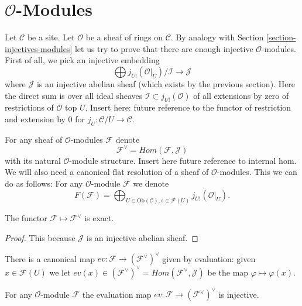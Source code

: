 \section{$\mathcal{O}$-Modules}
\label{section-sheaves-modules}

\noindent
Let $\mathcal{C}$ be a site.
Let $\mathcal{O}$ be a sheaf of rings on $\mathcal{C}$.
By analogy with Section \ref{section-injectives-modules}
let us try to prove that there are enough injective
$\mathcal{O}$-modules. First of all, we pick an injective
embedding
$$
\bigoplus j_{U!}(\mathcal{O}|_U)/\mathcal{I} \longrightarrow \mathcal{J}
$$
where $\mathcal{J}$ is an injective abelian sheaf (which
exists by the previous section). Here the direct sum is
over all ideal sheaves $\mathcal{I} \subset j_{U!}(\mathcal{O})$
of all extensions by zero of restrictions of $\mathcal{O}$
top $U$.
Insert here: future reference to the functor of restriction and
extension by $0$ for $j_U : \mathcal{C}/U \to \mathcal{C}$.


\medskip\noindent
For any sheaf of $\mathcal{O}$-modules $\mathcal{F}$
denote
$$
\mathcal{F}^\vee
=
\textit{Hom}(\mathcal{F}, \mathcal{J})
$$
with its natural $\mathcal{O}$-module structure. 
Insert here future reference to internal hom.
We will also need
a canonical flat resolution of a sheaf of $\mathcal{O}$-modules.
This we can do as follows: For any $\mathcal{O}$-module
$\mathcal{F}$ we denote
$$
F(\mathcal{F})
=
\bigoplus\nolimits_{U \in \text{Ob}(\mathcal{C}), s \in \mathcal{F}(U)}
j_{U!}(\mathcal{O}|_U).
$$

\begin{lemma}
\label{lemma-vee-exact-sheaves}
The functor $\mathcal{F} \mapsto \mathcal{F}^\vee$ is exact.
\end{lemma}

\begin{proof}
This because $\mathcal{J}$ is an injective abelian sheaf.
\end{proof}

\noindent
There is a canonical map $ev : \mathcal{F} \to (\mathcal{F}^\vee)^\vee$
given by evaluation: given $x \in \mathcal{F}(U)$ we let
$ev(x) \in (\mathcal{F}^\vee)^\vee = 
\textit{Hom}(\mathcal{F}^\vee, \mathcal{J})$
be the map $\varphi \mapsto \varphi(x)$.

\begin{lemma}
\label{lemma-ev-injective-sheaves}
For any $\mathcal{O}$-module $\mathcal{F}$ the evaluation map
$ev : \mathcal{F} \to (\mathcal{F}^\vee)^\vee$ is injective.
\end{lemma}


